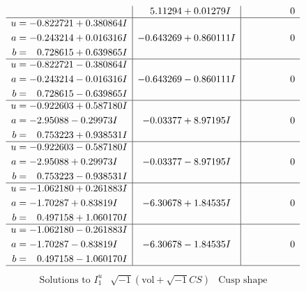 \documentclass[1p]{elsarticle_modified}
\theoremstyle{definition}
\newcommand{\I}{\sqrt{-1}}
\begin{document}
$$\begin{array}{c|c|c}
 & \phantom{-}5.11294 + 0.01279 I & \phantom{-0.000000 } 0 \\ \hline\begin{aligned}
u &= -0.822721 + 0.380864 I \\
a &= -0.243214 + 0.016316 I \\
b &= \phantom{-}0.728615 + 0.639865 I\end{aligned}
 & -0.643269 + 0.860111 I & \phantom{-0.000000 } 0 \\ \hline\begin{aligned}
u &= -0.822721 - 0.380864 I \\
a &= -0.243214 - 0.016316 I \\
b &= \phantom{-}0.728615 - 0.639865 I\end{aligned}
 & -0.643269 - 0.860111 I & \phantom{-0.000000 } 0 \\ \hline\begin{aligned}
u &= -0.922603 + 0.587180 I \\
a &= -2.95088 - 0.29973 I \\
b &= \phantom{-}0.753223 + 0.938531 I\end{aligned}
 & -0.03377 + 8.97195 I & \phantom{-0.000000 } 0 \\ \hline\begin{aligned}
u &= -0.922603 - 0.587180 I \\
a &= -2.95088 + 0.29973 I \\
b &= \phantom{-}0.753223 - 0.938531 I\end{aligned}
 & -0.03377 - 8.97195 I & \phantom{-0.000000 } 0 \\ \hline\begin{aligned}
u &= -1.062180 + 0.261883 I \\
a &= -1.70287 + 0.83819 I \\
b &= \phantom{-}0.497158 + 1.060170 I\end{aligned}
 & -6.30678 + 1.84535 I & \phantom{-0.000000 } 0 \\ \hline\begin{aligned}
u &= -1.062180 - 0.261883 I \\
a &= -1.70287 - 0.83819 I \\
b &= \phantom{-}0.497158 - 1.060170 I\end{aligned}
 & -6.30678 - 1.84535 I & \phantom{-0.000000 } 0\\
 \hline 
 \end{array}$$\newpage$$\begin{array}{c|c|c}  
\text{Solutions to }I^u_{1}& \I (\text{vol} + \sqrt{-1}CS) & \text{Cusp shape}\\

\end{array}$$
\end{document}
